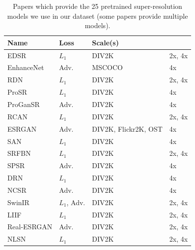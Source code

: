 \documentclass[10pt]{article} %
\begin{document}
\begin{table}[ht]
    \centering
    \caption{Papers which provide the 25 pretrained super-resolution models we use in our dataset (some papers provide multiple models). }
    \begin{tabular}{l l l l}
         \toprule
         Name       & Loss  & Scale(s)  \\
         \midrule
          EDSR \cite{lim2017enhanced}      & $L_1$            & DIV2K & 2x, 4x            \\
         EnhanceNet \cite{sajjadi2016enhancenet} & Adv.   & MSCOCO & 4x \\
         RDN \cite{zhang2018residual} & $L_1$ & DIV2K & 2x, 4x \\
         ProSR \cite{Wang2018AFP} & $L_1$ & DIV2K& 4x \\
         ProGanSR \cite{Wang2018AFP} & Adv. & DIV2K & 4x\\
         RCAN \cite{zhang2018image} & $L_1$ & DIV2K & 2x, 4x\\
         ESRGAN \cite{wang2018esrgan}& Adv. & DIV2K, Flickr2K, OST & 4x\\
         SAN \cite{Dai_2019_CVPR} & $L_1$ & DIV2K & 4x\\
         SRFBN \cite{li2019srfbn} & $L_1$ & DIV2K & 2x, 4x \\
         SPSR \cite{Ma_2020_CVPR} & Adv. &DIV2K & 4x \\
         DRN \cite{guo2020closed} & $L_1$ &DIV2K & 4x \\
         NCSR \cite{kim2021noise} & Adv. &DIV2K & 4x \\
         SwinIR \cite{liang2021swinir} & $L_1$, Adv. & DIV2K & 2x, 4x \\
         LIIF \cite{chen2021learning} & $L_1$ & DIV2K & 2x, 4x \\
         Real-ESRGAN \cite{wang2021realesrgan} & Adv. & DIV2K & 2x, 4x  \\
         NLSN \cite{Mei_2021_CVPR} & $L_1$ & DIV2K & 2x, 4x \\
         \bottomrule
    \end{tabular}
    \label{tab:expanded_pretrained_sisr_methods}
\end{table}
\end{document}

